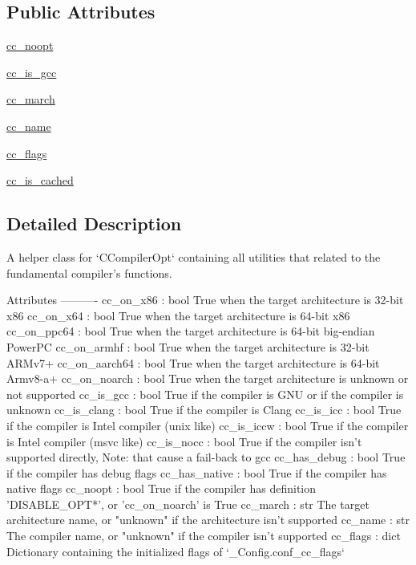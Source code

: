 \subsection*{Public Attributes}
\begin{DoxyCompactItemize}
\item 
\hyperlink{classnumpy_1_1distutils_1_1ccompiler__opt_1_1__CCompiler_a8367d6846cba0fbec91654ffef901de4}{cc\+\_\+noopt}
\item 
\hyperlink{classnumpy_1_1distutils_1_1ccompiler__opt_1_1__CCompiler_ab0586fb7f3df8341491c3e9b5b99ebc2}{cc\+\_\+is\+\_\+gcc}
\item 
\hyperlink{classnumpy_1_1distutils_1_1ccompiler__opt_1_1__CCompiler_ade0d13e65b8e946f9982cf1f70f19362}{cc\+\_\+march}
\item 
\hyperlink{classnumpy_1_1distutils_1_1ccompiler__opt_1_1__CCompiler_a9f4fef3859608eeb66ff26677bd63bc2}{cc\+\_\+name}
\item 
\hyperlink{classnumpy_1_1distutils_1_1ccompiler__opt_1_1__CCompiler_aa3d3f3acfd7e7310cd0b4ac27e697fc0}{cc\+\_\+flags}
\item 
\hyperlink{classnumpy_1_1distutils_1_1ccompiler__opt_1_1__CCompiler_a3fafe952e8699fe4e3745d954d3fe645}{cc\+\_\+is\+\_\+cached}
\end{DoxyCompactItemize}


\subsection{Detailed Description}
\begin{DoxyVerb}A helper class for `CCompilerOpt` containing all utilities that
related to the fundamental compiler's functions.

Attributes
----------
cc_on_x86 : bool
    True when the target architecture is 32-bit x86
cc_on_x64 : bool
    True when the target architecture is 64-bit x86
cc_on_ppc64 : bool
    True when the target architecture is 64-bit big-endian PowerPC
cc_on_armhf : bool
    True when the target architecture is 32-bit ARMv7+
cc_on_aarch64 : bool
    True when the target architecture is 64-bit Armv8-a+
cc_on_noarch : bool
    True when the target architecture is unknown or not supported
cc_is_gcc : bool
    True if the compiler is GNU or
    if the compiler is unknown
cc_is_clang : bool
    True if the compiler is Clang
cc_is_icc : bool
    True if the compiler is Intel compiler (unix like)
cc_is_iccw : bool
    True if the compiler is Intel compiler (msvc like)
cc_is_nocc : bool
    True if the compiler isn't supported directly,
    Note: that cause a fail-back to gcc
cc_has_debug : bool
    True if the compiler has debug flags
cc_has_native : bool
    True if the compiler has native flags
cc_noopt : bool
    True if the compiler has definition 'DISABLE_OPT*',
    or 'cc_on_noarch' is True
cc_march : str
    The target architecture name, or "unknown" if
    the architecture isn't supported
cc_name : str
    The compiler name, or "unknown" if the compiler isn't supported
cc_flags : dict
    Dictionary containing the initialized flags of `_Config.conf_cc_flags`
\end{DoxyVerb}
 

